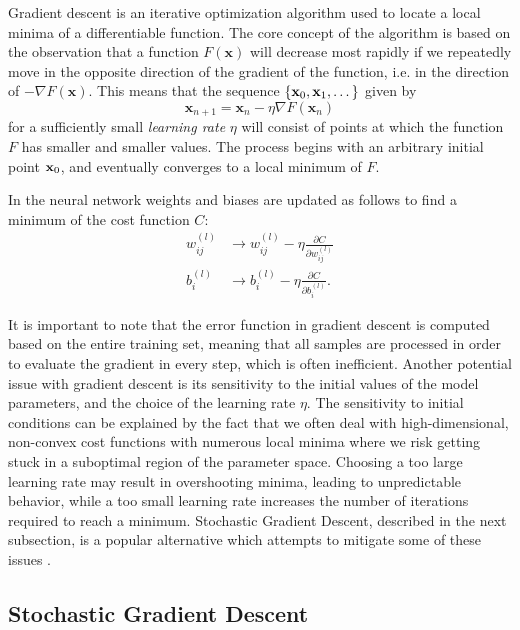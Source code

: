 \documentclass[a4paper, UKenglish, 11pt]{uiomaster}
\begin{document}
Gradient descent is an iterative optimization algorithm used to locate a local minima of a differentiable function. The core concept of the algorithm is based on the observation that a function $F(\textbf{x})$ will decrease most rapidly if we repeatedly move in the opposite direction of the gradient of the function, i.e. in the direction of
$- \nabla F(\textbf{x})$. This means that the sequence
\(\{\textbf x_0, \textbf x_1, \dots \}\)
given by
\begin{equation}
  \label{eq:gradient-descent-general-sequence}
  \textbf{x}_{n+1} = \textbf{x}_n - \eta \nabla F(\textbf{x}_n)
\end{equation}
for a sufficiently small \emph{learning rate} $\eta$ will consist of points at which the function \(F\) has smaller and smaller values.
The process begins with an arbitrary initial point $\textbf x_0$, and eventually converges to a local minimum of \(F\).

In the neural network weights and biases are updated as follows to find a minimum of the cost function \(C\):
\begin{align}
  w_{ij}^{(l)} &\to w_{ij}^{(l)} - \eta \frac{\partial C}{\partial w_{ij}^{(l)}} \\
  b_i^{(l)} &\to b_i^{(l)} - \eta \frac{\partial C}{\partial b_i^{(l)}}.
\end{align}

It is important to note that the error function in gradient descent is computed based on the entire training set, meaning that all samples are processed in order to evaluate the gradient in every step, which is often inefficient. Another potential issue with gradient descent is its sensitivity to the initial values of the model parameters, and the choice of the learning rate $\eta$. The sensitivity to initial conditions can be explained by the fact that we often deal with high-dimensional, non-convex cost functions with numerous local minima where we risk getting stuck in a suboptimal region of the parameter space. Choosing a too large learning rate may result in overshooting minima, leading to unpredictable behavior, while a too small learning rate increases the number of iterations required to reach a minimum. Stochastic Gradient Descent, described in the next subsection, is a popular alternative which attempts to mitigate some of these issues \cite{bishop2006pattern}.



\subsection{Stochastic Gradient Descent}
\end{document}
